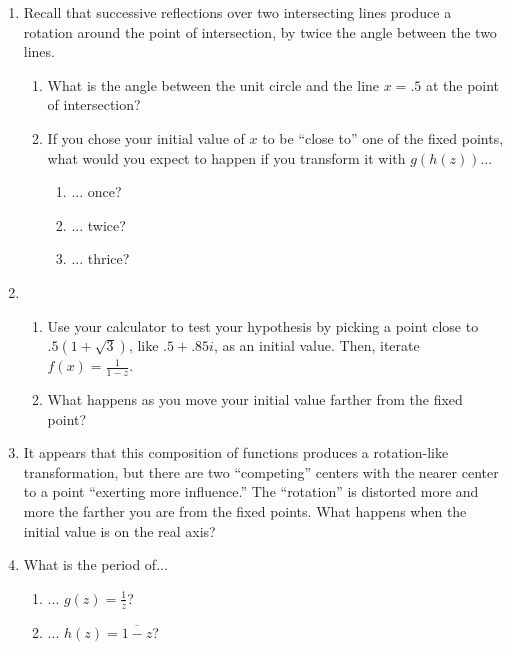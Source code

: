 \documentclass[../gatm.tex]{subfiles}
\begin{document}
\begin{enumerate}
\setcounter{enumi}{\value{problem_i}}
\item Recall that successive reflections over two intersecting lines produce a rotation around the point of intersection, by twice the angle between the two lines.
\begin{enumerate}
\item What is the angle between the unit circle and the line $x=.5$ at the point of intersection?
\item If you chose your initial value of $x$ to be ``close to'' one of the fixed points, what would you expect to happen if you transform it with $g(h(z))$...
\begin{multicols}{3}
\begin{enumerate}
\item ... once?
\item ... twice?
\item ... thrice?
\end{enumerate}
\end{multicols}
\end{enumerate}
\item \begin{enumerate}
\item Use your calculator to test your hypothesis by picking a point close to $.5(1+\sqrt{3})$, like $.5+.85i$, as an initial value. Then, iterate $f(x)=\frac{1}{1-z}$.
\item What happens as you move your initial value farther from the fixed point?
\end{enumerate}
\item It appears that this composition of functions produces a rotation-like transformation, but there are two ``competing'' centers with the nearer center to a point ``exerting more influence.'' The ``rotation'' is distorted more and more the farther you are from the fixed points. What happens when the initial value is on the real axis?
\item What is the period of...
\begin{multicols}{2}
\begin{enumerate}
\item ... $g(z)=\frac{1}{\overline{z}}$?
\item ... $h(z)=\overline{1-z}$?
\end{enumerate}
\end{multicols}
\setcounter{problem_i}{\value{enumi}}
\end{enumerate}
\end{document}

